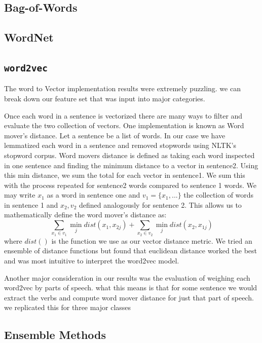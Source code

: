 \documentclass{article} %
\newcommand{\wordtvec}{\texttt{word2vec}}
\begin{document}
\subsection{Bag-of-Words} \label{sub:bow_res}

\subsection{WordNet} \label{sub:wnet_res}

\subsection{\wordtvec}
The word to Vector implementation results were extremely puzzling. we can break down our feature set that was input into major categories.

Once each word in a sentence is vectorized there are many ways to filter and evaluate the two collection of vectors. One implementation is known as Word mover's distance. Let a sentence be a list of words. In our case we have lemmatized each word in a sentence and removed stopwords using NLTK's stopword corpus. Word movers distance is defined as taking each word inspected in one sentence and finding the minimum distance to a vector in sentence2. Using this min distance, we sum the total for each vector in sentence1. We sum this with the process repeated for sentence2 words compared to sentence 1 words. We may write $x_1$ as a word in sentence one and $v_1 = \{x_1,...\}$ the collection of words in sentence 1 and $x_2, v_2$ defined analogously for sentence 2. This allows us to mathematically define the word mover's distance as:
$$ \sum_{x_1 \in v_1} \min_j{dist(x_1,x_{2j}) } + \sum_{x_2 \in v_2} \min_j{dist(x_2,x_{1j}) } $$
where $dist()$ is the function we use as our vector distance metric. We tried an ensemble of distance functions but found that euclidean distance worked the best and was most intuitive to interpret the word2vec model. 

Another major consideration in our results was the evaluation of weighing each word2vec by parts of speech. what this means is that for some sentence we would extract the verbs and compute word mover distance for just that part of speech. we replicated this for three major classes

\subsection{Ensemble Methods}
\end{document}
